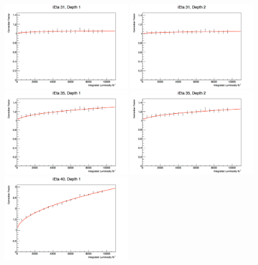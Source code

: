 			\begin{figure}[hbtp]
				\begin{center}
					\includegraphics[width=0.49\textwidth]{figures/Ch_4_raddam/HF_31D1.pdf}
					\includegraphics[width=0.49\textwidth]{figures/Ch_4_raddam/HF_31D2.pdf}
					\includegraphics[width=0.49\textwidth]{figures/Ch_4_raddam/HF_35D1.pdf}
					\includegraphics[width=0.49\textwidth]{figures/Ch_4_raddam/HF_35D2.pdf}
					\includegraphics[width=0.49\textwidth]{figures/Ch_4_raddam/HF_40D1.pdf}

\end{center}
\end{figure}
